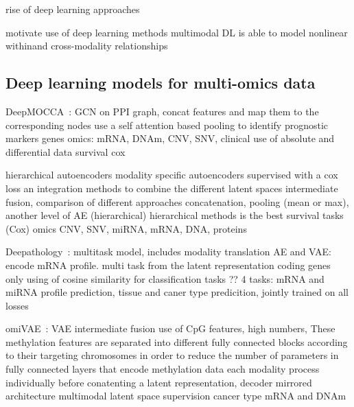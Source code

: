 \documentclass[../main.tex]{subfiles}
\begin{document}
		 rise of deep learning approaches 

		motivate use of deep learning methods
		multimodal DL is able to model nonlinear withinand cross-modality relationships
	\subsection{Deep learning models for multi-omics data}

	DeepMOCCA~\cite{Althubaiti_2021}: GCN on PPI graph, concat features and map them to the corresponding nodes 
	use a self attention based pooling to identify prognostic markers genes  
	omics: mRNA, DNAm, CNV, SNV, clinical 
	use of absolute and differential data
	survival cox 

	\cite{Wissel2021} hierarchical autoencoders 
	modality specific autoencoders supervised with a cox loss 
	an integration methods to combine the different latent spaces
	intermediate fusion, comparison of different approaches
	concatenation, pooling (mean or max), another level of AE (hierarchical)
	hierarchical methods is the best 
	survival tasks (Cox)
	omics CNV, SNV, miRNA, mRNA, DNA, proteins

	Deepathology~\cite{Azarkhalili2019}: multitask model, includes modality translation
	AE and VAE: encode mRNA profile.
	multi task from the latent representation 
	coding genes only 
	using of cosine similarity for classification tasks ??
	4 tasks: mRNA and miRNA profile prediction, tissue and caner type predicition, jointly trained on all losses 

	omiVAE~\cite{Zhang2019}: VAE intermediate fusion 
	use of CpG features, high numbers, 
	These methylation
features are separated into different fully connected blocks
according to their targeting chromosomes in order to reduce
the number of parameters in fully connected layers that encode
methylation data
	each modality process individually before conatenting a latent representation, decoder mirrored architecture
	multimodal latent space supervision cancer type 
	mRNA and DNAm 
\end{document}
